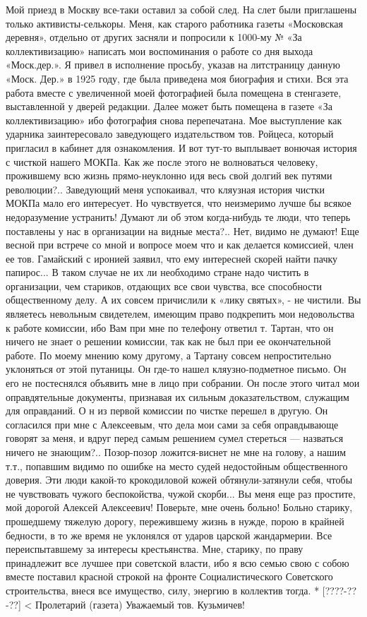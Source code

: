 \documentclass[]{memoir}
\begin{document}
Мой приезд в Москву все-таки оставил за собой след. На слет были приглашены только активисты-селькоры. Меня, как старого работника газеты «Московская деревня», отдельно от других засняли и попросили к 1000-му № «За коллективизацию» написать мои воспоминания о работе со дня выхода «Моск.дер.». Я привел в исполнение просьбу, указав на 
литстраницу данную «Моск. Дер.» в 1925 году, где была приведена моя биография и стихи. Вся эта работа вместе с увеличенной моей фотографией была помещена в стенгазете, выставленной у дверей редакции. Далее может быть помещена в газете «За коллективизацию» ибо фотография снова перепечатана.
Мое выступление как ударника заинтересовало заведующего издательством тов. Ройцеса, который пригласил в кабинет для ознакомления. И вот тут-то выплывает вонючая история с чисткой нашего МОКПа. Как же после этого не волноваться человеку, прожившему всю жизнь прямо-неуклонно идя весь свой долгий век путями революции?.. Заведующий меня успокаивал, что кляузная история чистки МОКПа мало его интересует. Но чувствуется, что неизмеримо лучше бы всякое недоразумение устранить!
Думают ли об этом когда-нибудь те люди, что теперь поставлены у нас в организации на видные места?.. Нет, видимо не думают! Еще весной при встрече со мной и вопросе моем что и как делается комиссией, член ее тов. Гамайский с иронией заявил, что ему интересней скорей найти пачку папирос... В таком случае не их ли необходимо стране надо чистить в организации, чем стариков, отдающих все свои чувства, все способности общественному делу. А их совсем причислили к «лику святых», - не чистили. Вы являетесь невольным свидетелем, имеющим право подкрепить мои недовольства к работе комиссии, ибо Вам при мне по телефону ответил т. Тартан, что он ничего не знает о решении комиссии, так как не был при ее окончательной работе. По моему мнению кому другому, а Тартану совсем непростительно уклоняться от этой путаницы. Он где-то нашел кляузно-подметное письмо. Он его не постеснялся объявить мне в лицо при собрании. Он после этого читал мои оправдятельные документы, признавая их сильным доказательством, служащим для оправданий. О н из первой комиссии по чистке перешел в другую. Он согласился при мне с Алексеевым, что дела мои сами за себя оправдывающе говорят за меня, и вдруг перед самым решением сумел стереться — назваться ничего не знающим?.. Позор-позор ложится-виснет не мне на голову, а нашим т.т., попавшим видимо по ошибке на место судей недостойным общественного доверия. Эти люди какой-то крокодиловой кожей обтянули-затянули себя, чтобы не чувствовать чужого беспокойства, чужой скорби...
Вы меня еще раз простите, мой дорогой Алексей Алексеевич! Поверьте, мне очень больно! Больно старику, прошедшему тяжелую дорогу, пережившему жизнь в нужде, порою в крайней бедности, в то же время не уклонялся от ударов царской жандармерии. Все переиспытавшему за интересы крестьянства. Мне, старику, по праву принадлежит все лучшее при советской власти, ибо я всю семью свою с собою вместе поставил красной строкой на фронте Социалистического Советского строительства, внеся все имущество, силу, энергию в коллектив тогда.
* [????-??-??] < Пролетарий (газета)
Уважаемый тов. Кузьмичев!
\end{document}
